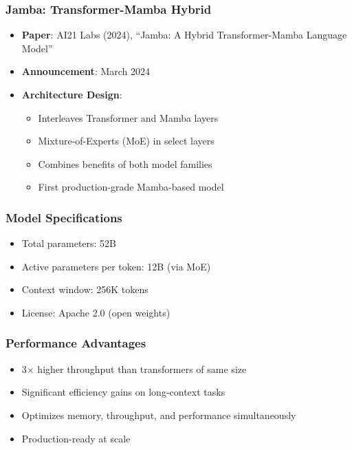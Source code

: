 \documentclass[11pt]{article}
\begin{document}
\subsubsection{Jamba: Transformer-Mamba Hybrid}
\begin{itemize}[leftmargin=*]
    \item \textbf{Paper}: AI21 Labs (2024), ``Jamba: A Hybrid Transformer-Mamba Language Model''~\cite{lieber2024jamba}
    \item \textbf{Announcement}: March 2024
    \item \textbf{Architecture Design}:
    \begin{itemize}
        \item Interleaves Transformer and Mamba layers
        \item Mixture-of-Experts (MoE) in select layers
        \item Combines benefits of both model families
        \item First production-grade Mamba-based model
    \end{itemize}
\end{itemize}

\subsubsection{Model Specifications}
\begin{itemize}[leftmargin=*]
    \item Total parameters: 52B
    \item Active parameters per token: 12B (via MoE)
    \item Context window: 256K tokens
    \item License: Apache 2.0 (open weights)
\end{itemize}

\subsubsection{Performance Advantages}
\begin{itemize}[leftmargin=*]
    \item 3× higher throughput than transformers of same size
    \item Significant efficiency gains on long-context tasks
    \item Optimizes memory, throughput, and performance simultaneously
    \item Production-ready at scale
\end{itemize}
\end{document}
